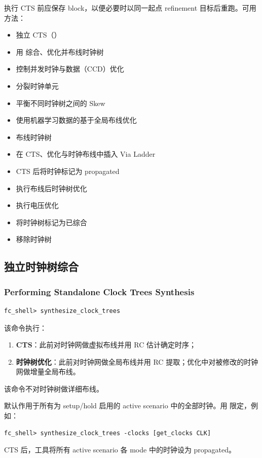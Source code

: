 执行 CTS 前应保存 block，以便必要时以同一起点 refinement 目标后重跑。可用方法：
\begin{itemize}
  \item 独立 CTS（）
  \item 用  综合、优化并布线时钟树
  \item 控制并发时钟与数据（CCD）优化
  \item 分裂时钟单元
  \item 平衡不同时钟树之间的 Skew
  \item 使用机器学习数据的基于全局布线优化
  \item 布线时钟树
  \item 在 CTS、优化与时钟布线中插入 Via Ladder
  \item CTS 后将时钟标记为 propagated
  \item 执行布线后时钟树优化
  \item 执行电压优化
  \item 将时钟树标记为已综合
  \item 移除时钟树
\end{itemize}

\subsection{独立时钟树综合}
\subsubsection*{Performing Standalone Clock Trees Synthesis}

\begin{lstlisting}
fc_shell> synthesize_clock_trees
\end{lstlisting}
该命令执行：
\begin{enumerate}
  \item \textbf{CTS}：此前对时钟网做虚拟布线并用 RC 估计确定时序；
  \item \textbf{时钟树优化}：此前对时钟网做全局布线并用 RC 提取；优化中对被修改的时钟网做增量全局布线。
\end{enumerate}
\begin{noteBox}
该命令不对时钟树做详细布线。
\end{noteBox}
默认作用于所有为 setup/hold 启用的 active scenario 中的全部时钟。用  限定，例如：
\begin{lstlisting}
fc_shell> synthesize_clock_trees -clocks [get_clocks CLK]
\end{lstlisting}
CTS 后，工具将所有 active scenario 各 mode 中的时钟设为 propagated。


